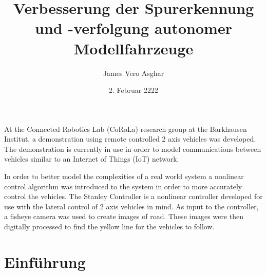 \documentclass[arbeit=studie,oneside,BCOR=12mm]{ArbeitRST}
\begin{document}

\author{James Vero Asghar}



\title{Verbesserung der Spurerkennung und -verfolgung autonomer Modellfahrzeuge}

\subtitle{}


\date{2. Februar 2222}


\pagestyle{plain}


\maketitle



\selbststaendigkeitserklaerung


{At the Connected Robotics Lab (CoRoLa) research group at the Barkhausen
Institut, a demonstration using remote controlled 2 axis vehicles was
developed. The demonstration is currently in use in order to model
communications between vehicles similar to an Internet of Things (IoT) network.

In order to better model the complexities of a real world system a nonlinear
control algorithm was introduced to the system in order to more accurately
control the vehicles. The Stanley Controller is a nonlinear controller
developed for use with the lateral control of 2 axis vehicles in mind. As input
to the controller, a fisheye camera was used to create images of road. These
images were then digitally processed to find the yellow line for the vehicles
to follow.}


\tableofcontents

\chapter{Einführung}
\end{document}
